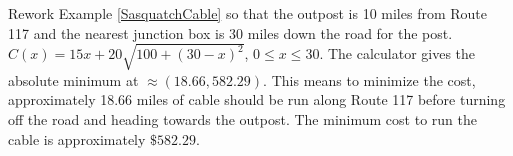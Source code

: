 {Rework Example \ref{SasquatchCable} so that the outpost is 10 miles from Route 117 and the nearest junction box is 30 miles down the road for the post.}
{$C(x) = 15x+20\sqrt{100+(30-x)^2}$, $0 \leq x \leq 30$.  The calculator gives the absolute minimum at $\approx (18.66, 582.29)$.  This means to minimize the cost, approximately 18.66 miles of cable should be run along Route 117 before turning off the road and heading towards the outpost.  The minimum cost to run the cable is approximately $\$582.29$.}